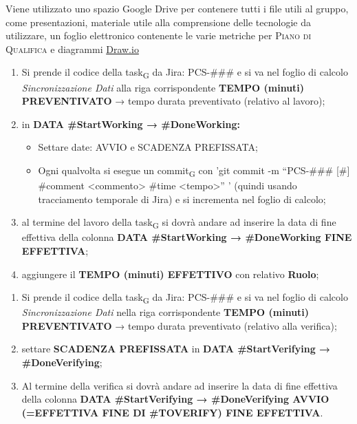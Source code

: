         Viene utilizzato uno spazio Google Drive per contenere tutti i file utili al gruppo, come presentazioni, materiale utile alla comprensione delle tecnologie da utilizzare, un foglio elettronico contenente le varie metriche per \textsc{Piano di Qualifica} e diagrammi \href{https://drawio-app.com/}{Draw.io}

        \begin{enumerate}
        	\item Si prende il codice della task\textsubscript{G} da Jira: PCS-\#\#\# e si va nel foglio di calcolo \textit{Sincronizzazione Dati} alla riga corrispondente \textbf{TEMPO (minuti) PREVENTIVATO} → tempo durata preventivato (relativo al lavoro);
        	\item in \textbf{DATA \#StartWorking → \#DoneWorking: }
        	\begin{itemize}
        		\item Settare date: AVVIO e SCADENZA PREFISSATA;
        		\item Ogni qualvolta si esegue un commit\textsubscript{G} con 'git {commit} -m “PCS-\#\#\# [\#<eventuale transizione>] \#comment <commento> \#time <tempo>” ' (quindi usando tracciamento temporale di Jira) e si incrementa nel foglio di calcolo;
        	\end{itemize}
        	\item al termine del lavoro della task\textsubscript{G} si dovrà andare ad inserire la data di fine effettiva della colonna \textbf{DATA \#StartWorking → \#DoneWorking FINE EFFETTIVA};
        	\item aggiungere il \textbf{TEMPO (minuti) EFFETTIVO} con relativo \textbf{Ruolo};
        \end{enumerate}

    	\begin{enumerate}
    		\item Si prende il codice della task\textsubscript{G} da Jira: PCS-\#\#\# e si va nel foglio di calcolo \textit{Sincronizzazione Dati} nella riga corrispondente \textbf{TEMPO (minuti) PREVENTIVATO} → tempo durata preventivato (relativo alla verifica);
    		\item settare \textbf{SCADENZA PREFISSATA} in \textbf{DATA \#StartVerifying → \#DoneVerifying};
    		\item Al termine della verifica si dovrà andare ad inserire la data di fine effettiva della colonna \textbf{DATA \#StartVerifying → \#DoneVerifying AVVIO (=EFFETTIVA FINE DI \#TOVERIFY) FINE EFFETTIVA}.
    	\end{enumerate}

